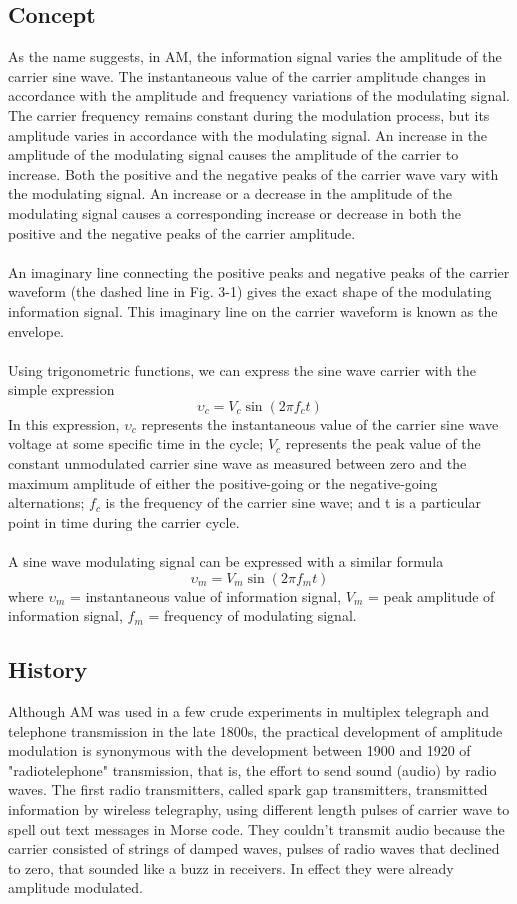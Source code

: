 \documentclass[english]{article}
\begin{document}
\subsection{Concept}
As the name suggests, in AM, the information signal varies the amplitude of the carrier
sine wave. The instantaneous value of the carrier amplitude changes in accordance with
the amplitude and frequency variations of the modulating signal. The carrier
frequency remains constant during the modulation process, but its amplitude varies in
accordance with the modulating signal. An increase in the amplitude of the modulating
signal causes the amplitude of the carrier to increase. Both the positive and the negative
peaks of the carrier wave vary with the modulating signal. An increase or a decrease in
the amplitude of the modulating signal causes a corresponding increase or decrease in both
the positive and the negative peaks of the carrier amplitude.\\\\
An imaginary line connecting the positive peaks and negative peaks of the carrier
waveform (the dashed line in Fig. 3-1) gives the exact shape of the modulating
information signal. This imaginary line on the carrier waveform is known as the
envelope.\\\\
Using trigonometric functions, we can express the sine wave carrier with the simple
expression
$$
\upsilon_c=V_c \sin(2\pi f_ct)
$$
In this expression, $\upsilon_c$ represents the instantaneous value of the carrier sine wave voltage
at some specific time in the cycle; $V_c$ represents the peak value of the constant unmodulated carrier sine wave as measured between zero and the maximum amplitude of either
the positive-going or the negative-going alternations; $f_c$ is the frequency of the
carrier sine wave; and t is a particular point in time during the carrier cycle.\\\\
A sine wave modulating signal can be expressed with a similar formula
$$
\upsilon_m=V_m \sin(2 \pi f_m t)
$$
where $\upsilon_m$ = instantaneous value of information signal,
	$V_m$	  = peak amplitude of information signal,
	$f_m$ = frequency of modulating signal.
\subsection{History}
Although AM was used in a few crude experiments in multiplex telegraph and telephone transmission in the late 1800s, the practical development of amplitude modulation is synonymous with the development between 1900 and 1920 of "radiotelephone" transmission, that is, the effort to send sound (audio) by radio waves. The first radio transmitters, called spark gap transmitters, transmitted information by wireless telegraphy, using different length pulses of carrier wave to spell out text messages in Morse code. They couldn't transmit audio because the carrier consisted of strings of damped waves, pulses of radio waves that declined to zero, that sounded like a buzz in receivers. In effect they were already amplitude modulated.
\end{document}
